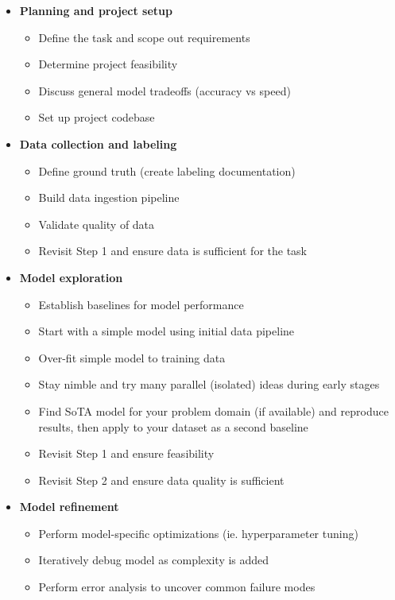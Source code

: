 \documentclass[lang=english,inputenc=utf8,fontsize=10pt]{ldvarticle}
\begin{document}
\begin{itemize}
    \item \textbf{Planning and project setup}
    \begin{itemize}
        \item Define the task and scope out requirements
        \item Determine project feasibility
        \item Discuss general model tradeoffs (accuracy vs speed)
        \item Set up project codebase
    \end{itemize}
    \item \textbf{Data collection and labeling}
    \begin{itemize}
        \item Define ground truth (create labeling documentation)
        \item Build data ingestion pipeline
        \item Validate quality of data
        \item Revisit Step 1 and ensure data is sufficient for the task
    \end{itemize}
    \item \textbf{Model exploration}
    \begin{itemize}
        \item Establish baselines for model performance
        \item Start with a simple model using initial data pipeline
        \item Over-fit simple model to training data
        \item Stay nimble and try many parallel (isolated) ideas during early stages
        \item Find SoTA model for your problem domain (if available) and reproduce results, then apply to your dataset as a second baseline
        \item Revisit Step 1 and ensure feasibility
        \item Revisit Step 2 and ensure data quality is sufficient
    \end{itemize}
    \item \textbf{Model refinement}
    \begin{itemize}
        \item Perform model-specific optimizations (ie. hyperparameter tuning)
        \item Iteratively debug model as complexity is added
        \item Perform error analysis to uncover common failure modes

\end{itemize}
\end{itemize}
\end{document}
